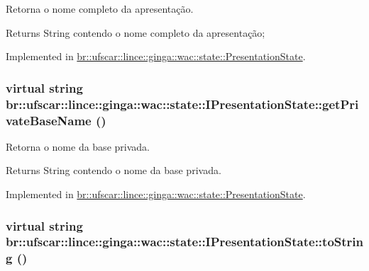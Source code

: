 Retorna o nome completo da apresentação. 

\begin{DoxyReturn}{Returns}
String contendo o nome completo da apresentação; 
\end{DoxyReturn}


Implemented in \hyperlink{classbr_1_1ufscar_1_1lince_1_1ginga_1_1wac_1_1state_1_1PresentationState_af4149387468f9a7180c036f4fdce03bd}{br::ufscar::lince::ginga::wac::state::PresentationState}.

\hypertarget{classbr_1_1ufscar_1_1lince_1_1ginga_1_1wac_1_1state_1_1IPresentationState_a53e509fcb89622fa57b299526f96f728}{
\subsubsection[{getPrivateBaseName}]{\setlength{\rightskip}{0pt plus 5cm}virtual string br::ufscar::lince::ginga::wac::state::IPresentationState::getPrivateBaseName ()}}
\label{classbr_1_1ufscar_1_1lince_1_1ginga_1_1wac_1_1state_1_1IPresentationState_a53e509fcb89622fa57b299526f96f728}


Retorna o nome da base privada. 

\begin{DoxyReturn}{Returns}
String contendo o nome da base privada. 
\end{DoxyReturn}


Implemented in \hyperlink{classbr_1_1ufscar_1_1lince_1_1ginga_1_1wac_1_1state_1_1PresentationState_a5b280537bd03a744eb41807859f01413}{br::ufscar::lince::ginga::wac::state::PresentationState}.

\hypertarget{classbr_1_1ufscar_1_1lince_1_1ginga_1_1wac_1_1state_1_1IPresentationState_a148a58eee3e6f96ae226f8360696d944}{
\subsubsection[{toString}]{\setlength{\rightskip}{0pt plus 5cm}virtual string br::ufscar::lince::ginga::wac::state::IPresentationState::toString ()}}
\label{classbr_1_1ufscar_1_1lince_1_1ginga_1_1wac_1_1state_1_1IPresentationState_a148a58eee3e6f96ae226f8360696d944}


